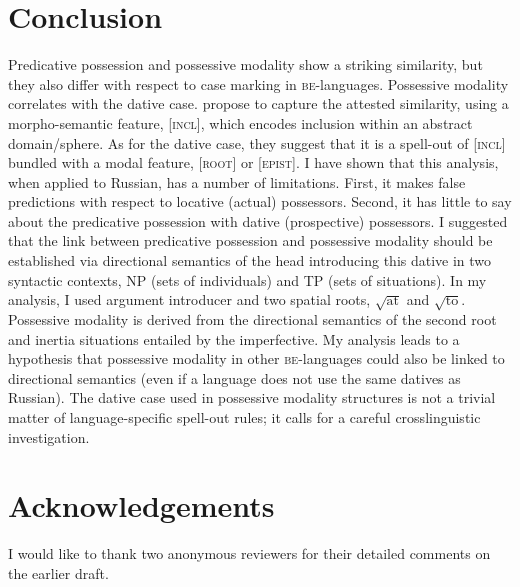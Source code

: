 \documentclass[output=paper,colorlinks,citecolor=brown,modfonts,nonflat]{langsci/langscibook}
\begin{document}
\section{Conclusion}\label{sec:tsedryk:5}

Predicative possession and possessive modality show a striking similarity, but they also differ with respect to case marking in \textsc{be}{}-languages. Possessive modality correlates with the dative case. \citet{BjorkmanCowper2016} propose to capture the attested similarity, using a morpho-semantic feature, [\textsc{incl}], which encodes inclusion within an abstract domain/sphere. As for the dative case, they suggest that it is a spell-out of [\textsc{incl}] bundled with a modal feature, [\textsc{root}] or [\textsc{epist}]. I have shown that this analysis, when applied to Russian, has a number of limitations. First, it makes false predictions with respect to locative (actual) possessors. Second, it has little to say about the predicative possession with dative (prospective) possessors. I suggested that the link between predicative possession and possessive modality should be established via directional semantics of the head introducing this dative in two syntactic contexts, NP (sets of individuals) and TP (sets of situations). In my analysis, I used  argument introducer and two spatial roots,  $\sqrt{\text{at}}$  and  $\sqrt{\text{to}}$. Possessive modality is derived from the directional semantics of the second root and inertia situations entailed by the imperfective. My analysis leads to a hypothesis that possessive modality in other \textsc{be}{}-languages could also be linked to directional semantics (even if a language does not use the same datives as Russian). The dative case used in possessive modality structures is not a trivial matter of language-specific spell-out rules; it calls for a careful crosslinguistic investigation.  

\section*{Acknowledgements}

I would like to thank two anonymous reviewers for their detailed comments on the earlier draft.

\sloppy\printbibliography[heading=subbibliography,notkeyword=this]
\end{document}
